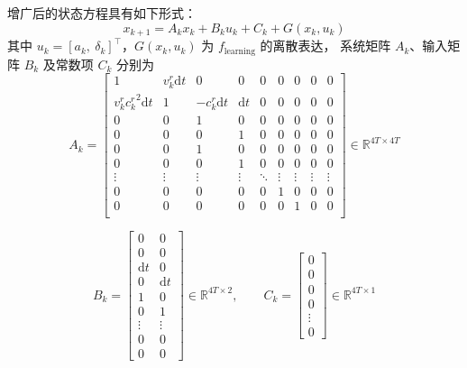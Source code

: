 增广后的状态方程具有如下形式：
\begin{equation}
    x_{k+1} = A_k x_k + B_k u_k + C_k + G(x_k, u_k)
\end{equation}
其中 $u_k = [a_k,\ \delta_k]^\top$，$G(x_k, u_k)$ 为 $f_{\mathrm{learning}}$ 的离散表达，
系统矩阵 $A_k$、输入矩阵 $B_k$ 及常数项 $C_k$ 分别为
\begin{equation} \label{equ:augmented_A}
    A_k = 
    \begin{bmatrix}
        1 & v_k^r \mathrm{d}t & 0 & 0 & 0 & 0 & 0 & 0 & 0 \\
        v_k^r {c_k^r}^2 \mathrm{d}t & 1 & -c_k^r \mathrm{d}t & \mathrm{d}t & 0 & 0 & 0 & 0 & 0 \\
        0 & 0 & 1 & 0 & 0 & 0 & 0 & 0 & 0 \\
        0 & 0 & 0 & 1 & 0 & 0 & 0 & 0 & 0 \\
        0 & 0 & 1 & 0 & 0 & 0 & 0 & 0 & 0 \\
        0 & 0 & 0 & 1 & 0 & 0 & 0 & 0 & 0 \\
        \vdots & \vdots & \vdots & \vdots & \ddots & \vdots & \vdots & \vdots & \vdots \\
        0 & 0 & 0 & 0 & 0 & 1 & 0 & 0 & 0 \\
        0 & 0 & 0 & 0 & 0 & 0 & 1 & 0 & 0 \\
    \end{bmatrix} \in \mathbb{R}^{4T \times 4T}
\end{equation}

\begin{equation} \label{equ:augmented_B}
    B_k = 
    \begin{bmatrix}
        0 & 0 \\
        0 & 0 \\
        \mathrm{d}t & 0 \\
        0 & \mathrm{d}t \\
        1 & 0 \\
        0 & 1 \\
        \vdots & \vdots \\
        0 & 0 \\
        0 & 0 
    \end{bmatrix} \in \mathbb{R}^{4T \times 2}, \qquad
    C_k = \begin{bmatrix}
        0 \\ 0 \\ 0 \\ 0 \\ \vdots \\ 0
    \end{bmatrix} \in \mathbb{R}^{4T \times 1}
\end{equation}

